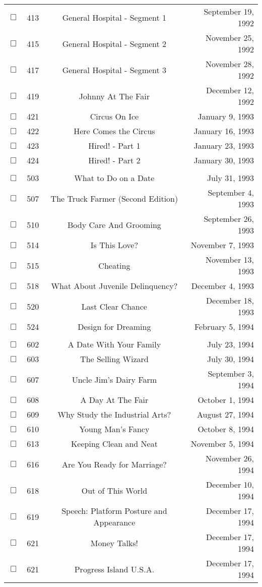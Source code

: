 \documentclass[12pt]{article}
\begin{document}
\begin{center}
\begin{longtable}[c]{cccr}
$\Box$&413&General Hospital - Segment 1&September 19, 1992\\
$\Box$&415&General Hospital - Segment 2&November 25, 1992\\
$\Box$&417&General Hospital - Segment 3&November 28, 1992\\
$\Box$&419&Johnny At The Fair&December 12, 1992\\
$\Box$&421&Circus On Ice&January 9, 1993\\
$\Box$&422&Here Comes the Circus&January 16, 1993\\
$\Box$&423&Hired! - Part 1&January 23, 1993\\
$\Box$&424&Hired! - Part 2&January 30, 1993\\
\\
$\Box$&503&What to Do on a Date&July 31, 1993\\
$\Box$&507&The Truck Farmer (Second Edition)&September 4, 1993\\
$\Box$&510&Body Care And Grooming&September 26, 1993\\
$\Box$&514&Is This Love?&November 7, 1993\\
$\Box$&515&Cheating&November 13, 1993\\
$\Box$&518&What About Juvenile Delinquency?&December 4, 1993\\
$\Box$&520&Last Clear Chance&December 18, 1993\\
$\Box$&524&Design for Dreaming&February 5, 1994\\
\\
$\Box$&602&A Date With Your Family&July 23, 1994\\
$\Box$&603&The Selling Wizard&July 30, 1994\\
$\Box$&607&Uncle Jim's Dairy Farm&September 3, 1994\\
$\Box$&608&A Day At The Fair&October 1, 1994\\
$\Box$&609&Why Study the Industrial Arts?&August 27, 1994\\
$\Box$&610&Young Man's Fancy&October 8, 1994\\
$\Box$&613&Keeping Clean and Neat&November 5, 1994\\
$\Box$&616&Are You Ready for Marriage?&November 26, 1994\\
$\Box$&618&Out of This World&December 10, 1994\\
$\Box$&619&Speech: Platform Posture and Appearance&December 17, 1994\\
$\Box$&621&Money Talks!&December 17, 1994\\
$\Box$&621&Progress Island U.S.A.&December 17, 1994\\

\end{longtable}
\end{center}
\end{document}
